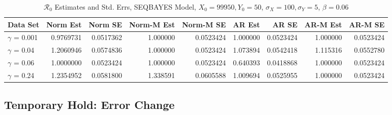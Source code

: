 \documentclass[12pt]{article}
\newcommand{\rr}{\ensuremath{\mathcal{R}_0}}
\begin{document}
\begin{table}[H]
	
	\caption{\label{tab:}$\rr$ Estimates and Std. Errs, SEQBAYES Model,
		$X_0 = 99950, Y_0 = 50$, $\sigma_X = 100, \sigma_Y = 5$, $\beta = 0.06$}
	\centering
	\begin{footnotesize}
	\begin{tabular}[t]{l|r|r|r|r|r|r|r|r}
		\hline
		Data Set & Norm Est & Norm SE & Norm-M Est & Norm-M SE & AR Est & AR SE & AR-M Est & AR-M SE\\
		\hline
		$\gamma$ = 0.001 & 0.9769731 & 0.0517362 & 1.000000 & 0.0523424 & 1.000000 & 0.0523424 & 1.000000 & 0.0523424\\
		\hline
		$\gamma$ = 0.04 & 1.2060946 & 0.0574836 & 1.000000 & 0.0523424 & 1.073894 & 0.0542418 & 1.115316 & 0.0552780\\
		\hline
		$\gamma$ = 0.06 & 1.0000000 & 0.0523424 & 1.000000 & 0.0523424 & 0.640393 & 0.0418868 & 1.000000 & 0.0523424\\
		\hline
		$\gamma$ = 0.24 & 1.2354952 & 0.0581800 & 1.338591 & 0.0605588 & 1.009694 & 0.0525955 & 1.000000 & 0.0523424\\
		\hline
	\end{tabular}
\end{footnotesize}
\end{table}

\subsection{Temporary Hold: Error Change}
\end{document}
